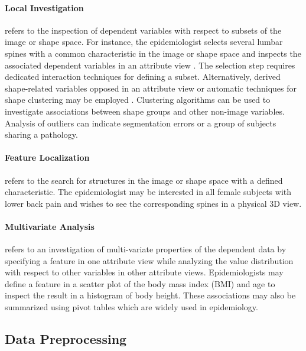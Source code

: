 \documentclass[journal]{style/vgtc} 			          %
\begin{document}
\paragraph{Local Investigation} refers to the inspection of dependent variables with respect to subsets of the image or shape space.
%
For instance, the epidemiologist selects several lumbar spines with a common characteristic in the image or shape space and inspects the associated dependent variables in an attribute view \cite{Hermann2014}.
%
The selection step requires dedicated interaction techniques for defining a subset.
%
Alternatively, derived shape-related variables opposed in an attribute view or automatic techniques for shape clustering may be employed \cite{Klemm2013VMV}.
%
Clustering algorithms can be used to investigate associations between shape groups and other non-image variables.
%
Analysis of outliers can indicate segmentation errors or a group of subjects sharing a pathology.

\paragraph{Feature Localization} refers to the search for structures in the image or shape space with a defined characteristic.
%
The epidemiologist may be interested in all female subjects with lower back pain and wishes to see the corresponding spines in a physical 3D view.

\paragraph{Multivariate Analysis} refers to an investigation of multi-variate properties of the dependent data by specifying a feature in one attribute view while analyzing the value distribution with respect to other variables in other attribute views.
%
Epidemiologists may define a feature in a scatter plot of the body mass index (BMI) and age to inspect the result in a histogram of body height.
%
These associations may also be summarized using pivot tables which are widely used in epidemiology.

\subsection{Data Preprocessing} \label{Data Preprocessing}
\end{document}
